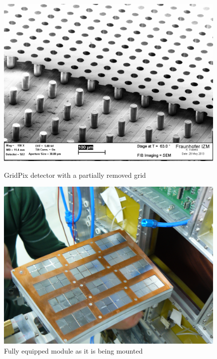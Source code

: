 \begin{figure}
	\begin{minipage}{.49\textwidth}
		\includegraphics[width=\textwidth]{Tracker/TPC/GridPixes}
		\caption{GridPix detector with a partially removed grid}
		\label{fig:TPC:GridPix:GridPix}
	\end{minipage}
	\hfill
	\begin{minipage}{.49\textwidth}
		\includegraphics[width=\textwidth]{Tracker/TPC/FullModule}
		\caption{Fully equipped module as it is being mounted}
		\label{fig:TPC:GridPix:module}
	\end{minipage}
\end{figure}

